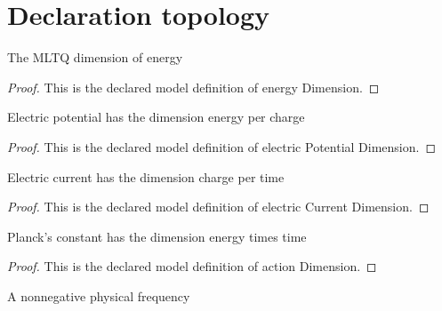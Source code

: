 \section{Declaration topology}
\begin{definition}
  \label{def:physics:phyx-mini-0498:phyxminiproblems-problemphyxmini0498-energydimension}
  The MLTQ dimension of energy
\end{definition}
\begin{proof}
  This is the declared model definition of energy Dimension.
\end{proof}
\begin{definition}
  \label{def:physics:phyx-mini-0498:phyxminiproblems-problemphyxmini0498-electricpotentialdimension}
  Electric potential has the dimension energy per charge
\end{definition}
\begin{proof}
  This is the declared model definition of electric Potential Dimension.
\end{proof}
\begin{definition}
  \label{def:physics:phyx-mini-0498:phyxminiproblems-problemphyxmini0498-electriccurrentdimension}
  Electric current has the dimension charge per time
\end{definition}
\begin{proof}
  This is the declared model definition of electric Current Dimension.
\end{proof}
\begin{definition}
  \label{def:physics:phyx-mini-0498:phyxminiproblems-problemphyxmini0498-actiondimension}
  Planck's constant has the dimension energy times time
\end{definition}
\begin{proof}
  This is the declared model definition of action Dimension.
\end{proof}
\begin{definition}
  \label{def:physics:phyx-mini-0498:phyxminiproblems-problemphyxmini0498-frequencyquantity}
  A nonnegative physical frequency
\end{definition}
